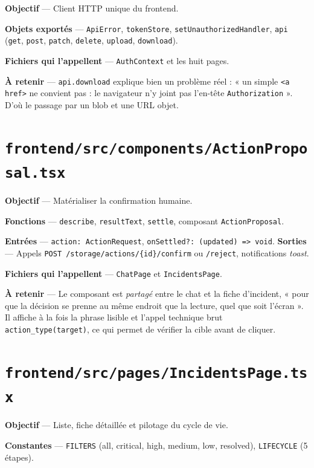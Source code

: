 \documentclass[11pt,a4paper]{report}
\newcommand{\file}[1]{\texttt{\small #1}}
\newcommand{\fn}[1]{\texttt{\small\textcolor{oasisviolet}{#1}}}
\newcommand{\cls}[1]{\texttt{\small\textcolor{oasisblue}{#1}}}
\newcommand{\route}[1]{\texttt{\small\textcolor{oasisgreen}{#1}}}
\begin{document}
\textbf{Objectif} --- Client HTTP unique du frontend.

\textbf{Objets exportés} --- \cls{ApiError}, \fn{tokenStore},
\fn{setUnauthorizedHandler}, \fn{api} (\fn{get}, \fn{post}, \fn{patch},
\fn{delete}, \fn{upload}, \fn{download}).

\textbf{Fichiers qui l'appellent} --- \cls{AuthContext} et les huit pages.

\textbf{À retenir} --- \fn{api.download} explique bien un problème réel : « un
simple \texttt{<a href>} ne convient pas : le navigateur n'y joint pas
l'en-tête \texttt{Authorization} ». D'où le passage par un blob et une URL
objet.

\section{\file{frontend/src/components/ActionProposal.tsx}}

\textbf{Objectif} --- Matérialiser la confirmation humaine.

\textbf{Fonctions} --- \fn{describe}, \fn{resultText}, \fn{settle},
composant \cls{ActionProposal}.

\textbf{Entrées} --- \texttt{action: ActionRequest},
\texttt{onSettled?: (updated) => void}.
\textbf{Sorties} --- Appels \route{POST /storage/actions/\{id\}/confirm} ou
\route{/reject}, notifications \emph{toast}.

\textbf{Fichiers qui l'appellent} --- \cls{ChatPage} et \cls{IncidentsPage}.

\textbf{À retenir} --- Le composant est \emph{partagé} entre le chat et la fiche
d'incident, « pour que la décision se prenne au même endroit que la lecture,
quel que soit l'écran ». Il affiche à la fois la phrase lisible et l'appel
technique brut \texttt{action\_type(target)}, ce qui permet de vérifier la cible
avant de cliquer.

\section{\file{frontend/src/pages/IncidentsPage.tsx}}

\textbf{Objectif} --- Liste, fiche détaillée et pilotage du cycle de vie.

\textbf{Constantes} --- \texttt{FILTERS} (all, critical, high, medium, low,
resolved), \texttt{LIFECYCLE} (5 étapes).
\end{document}
